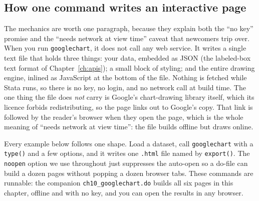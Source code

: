 \documentclass[
    a4paper,
    fontsize=10pt,
    twoside=true,
    numbers=noenddot,
]{kaobook}
\begin{document}
\subsection{How one command writes an interactive page}\label{sec:gc-how}
The mechanics are worth one paragraph, because they explain both the \enquote{no key} promise and the \enquote{needs network at view time} caveat that newcomers trip over. When you run \texttt{googlechart}, it does not call any web service. It writes a single text file that holds three things: your data, embedded as JSON (the labeled-box text format of Chapter~\ref{ch:apis}); a small block of styling; and the entire drawing engine, inlined as JavaScript at the bottom of the file. Nothing is fetched while Stata runs, so there is no key, no login, and no network call at build time. The one thing the file does \emph{not} carry is Google's chart-drawing library itself, which its licence forbids redistributing, so the page links out to Google's copy. That link is followed by the reader's browser when they open the page, which is the whole meaning of \enquote{needs network at view time}: the file builds offline but draws online.

Every example below follows one shape. Load a dataset, call \texttt{googlechart} with a \texttt{type()} and a few options, and it writes one \texttt{.html} file named by \texttt{export()}. The \texttt{noopen} option we use throughout just suppresses the auto-open so a do-file can build a dozen pages without popping a dozen browser tabs. These commands are runnable: the companion \texttt{ch10\_googlechart.do} builds all six pages in this chapter, offline and with no key, and you can open the results in any browser.
\end{document}
